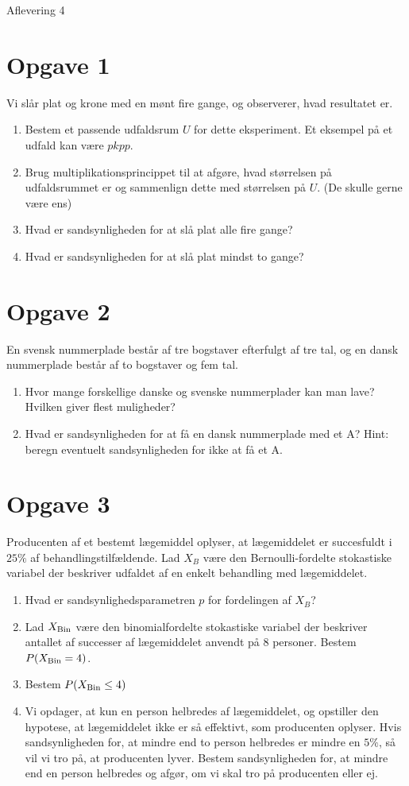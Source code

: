
\begin{center}
\Huge
Aflevering 4
\end{center}
\section*{Opgave 1}
Vi slår plat og krone med en mønt fire gange, og observerer, hvad resultatet er.
\begin{enumerate}[label=\roman*)]
\item Bestem et passende udfaldsrum $U$ for dette eksperiment. Et eksempel på et udfald kan være $pkpp$.
\item Brug multiplikationsprincippet til at afgøre, hvad størrelsen på udfaldsrummet er og sammenlign dette med størrelsen på $U$. (De skulle gerne være ens)
\item Hvad er sandsynligheden for at slå plat alle fire gange?
\item Hvad er sandsynligheden for at slå plat mindst to gange?
\end{enumerate}
\section*{Opgave 2}
En svensk nummerplade består af tre bogstaver efterfulgt af tre tal, og en dansk nummerplade består af to bogstaver og fem tal. 
\begin{enumerate}[label=\roman*)]
\item Hvor mange forskellige danske og svenske nummerplader kan man lave? Hvilken giver flest muligheder?
\item Hvad er sandsynligheden for at få en dansk nummerplade med et A? Hint: beregn eventuelt sandsynligheden for ikke at få et A.
\end{enumerate}

\section*{Opgave 3}
Producenten af et bestemt lægemiddel oplyser, at lægemiddelet er succesfuldt i $25\%$ af behandlingstilfældende. Lad $X_B$ være den Bernoulli-fordelte stokastiske variabel der beskriver udfaldet af en enkelt behandling med lægemiddelet. 
\begin{enumerate}[label=\roman*)]
\item Hvad er sandsynlighedsparametren $p$ for fordelingen af $X_B$?
\item Lad $X_{\textnormal{Bin}}$ være den binomialfordelte stokastiske variabel der beskriver antallet af successer af lægemiddelet anvendt på $8$ personer. Bestem $P(X_{\textnormal{Bin}} = 4)$.
\item Bestem $P(X_{\textnormal{Bin}} \leq 4)$
\item Vi opdager, at kun en person helbredes af lægemiddelet, og opstiller den hypotese, at lægemiddelet ikke er så effektivt, som producenten oplyser. Hvis sandsynligheden for, at mindre end to person helbredes er mindre en $5\%$, så vil vi tro på, at producenten lyver. Bestem sandsynligheden for, at mindre end en person helbredes og afgør, om vi skal tro på producenten eller ej. 
\end{enumerate}

